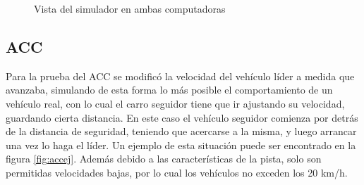 \begin{figure}[H]
 \centering
 \caption{Vista del simulador en ambas computadoras}
 \label{fig:vlidseg}
\end{figure}

\subsection{ACC}
Para la prueba del ACC se modificó la velocidad del vehículo líder a medida que avanzaba, simulando de esta forma lo más posible el comportamiento de un vehículo real, con lo cual el carro seguidor tiene que ir ajustando su velocidad, guardando cierta distancia. En este caso el vehículo seguidor comienza por detrás de la distancia de seguridad, teniendo que acercarse a la misma, y luego arrancar una vez lo haga el líder. Un ejemplo de esta situación puede ser encontrado en la figura \ref{fig:accej}. Además debido a las características de la pista, solo son permitidas velocidades bajas, por lo cual los vehículos no exceden los 20 km/h.\\

